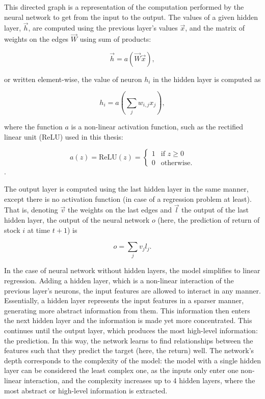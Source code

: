 		This directed graph is a representation of the computation performed by the neural network to get from the input to the output. The values of a given hidden layer, $\vec{h}$, are computed using the previous layer's values $\vec{x}$, and the matrix of weights on the edges $\vec{W}$ using sum of products: 
		
		\begin{equation}
			\label{eqn:hidden_layer}
			\vec{h} = a(\vec{W}\vec{x}),
		\end{equation}
		
		or written element-wise, the value of neuron $h_i$ in the hidden layer is computed as 
		
		\begin{equation*}
			h_i = a \left( \sum_{j}w_{i,j}x_j \right),
		\end{equation*}
		
		where the function $a$ is a non-linear activation function, such as the rectified linear unit (ReLU) used in this thesis:
		
		\[
			a(z) = \text{ReLU}(z) =   
				\begin{cases}
					1 & \text{if } z \geq 0\\
					0 & \text{otherwise.}
				\end{cases}
		\]. 
		
		
		The output layer is computed using the last hidden layer in the same manner, except there is no activation function (in case of a regression problem at least). That is, denoting $\vec{v}$ the weights on the last edges and $\vec{l}$ the output of the last hidden layer, the output of the neural network $o$ (here, the prediction of return of stock $i$ at time $t+1$) is 
		
		\begin{equation}
			o = \sum_{j}v_{j} l_j.
		\end{equation}
		
		In the case of neural network without hidden layers, the model simplifies to linear regression. Adding a hidden layer, which is a non-linear interaction of the previous layer's neurons, the input features are allowed to interact in any manner. Essentially, a hidden layer represents the input features in a sparser manner, generating more abstract information from them. This information then enters the next hidden layer and the information is made yet more concentrated. This continues until the output layer, which produces the most high-level information: the prediction. In this way, the network learns to find relationships between the features such that they predict the target (here, the return) well. The network's depth corresponds to the complexity of the model: the model with a single hidden layer can be considered the least complex one, as the inputs only enter one non-linear interaction, and the complexity increases up to 4 hidden layers, where the most abstract or high-level information is extracted.
		
